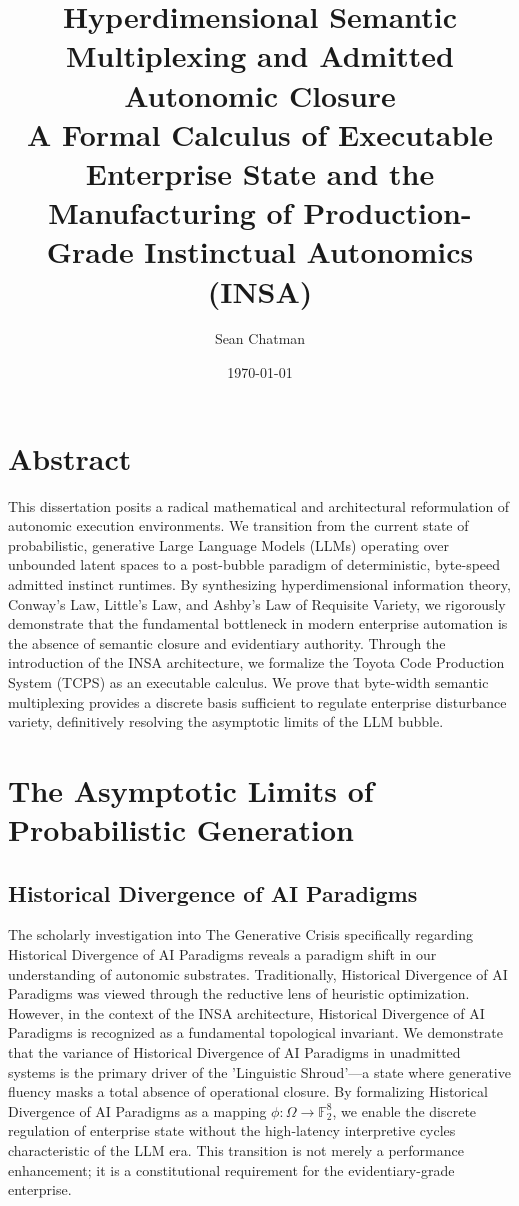 \documentclass[12pt,a4paper,oneside]{book}
\title{\textbf{Hyperdimensional Semantic Multiplexing and Admitted Autonomic Closure}\\\vspace{1em}\Large A Formal Calculus of Executable Enterprise State and the Manufacturing of Production-Grade Instinctual Autonomics (INSA)}
\author{Sean Chatman}
\date{\today}
\begin{document}
\maketitle

\chapter*{Abstract}
This dissertation posits a radical mathematical and architectural reformulation of autonomic execution environments. We transition from the current state of probabilistic, generative Large Language Models (LLMs) operating over unbounded latent spaces to a post-bubble paradigm of deterministic, byte-speed admitted instinct runtimes. By synthesizing hyperdimensional information theory, Conway's Law, Little's Law, and Ashby's Law of Requisite Variety, we rigorously demonstrate that the fundamental bottleneck in modern enterprise automation is the absence of semantic closure and evidentiary authority. Through the introduction of the INSA architecture, we formalize the Toyota Code Production System (TCPS) as an executable calculus. We prove that byte-width semantic multiplexing provides a discrete basis sufficient to regulate enterprise disturbance variety, definitively resolving the asymptotic limits of the LLM bubble.

\tableofcontents
\chapter{The Asymptotic Limits of Probabilistic Generation}\section{Historical Divergence of AI Paradigms}
The scholarly investigation into The Generative Crisis specifically regarding Historical Divergence of AI Paradigms reveals a paradigm shift in our understanding of autonomic substrates. Traditionally, Historical Divergence of AI Paradigms was viewed through the reductive lens of heuristic optimization. However, in the context of the INSA architecture, Historical Divergence of AI Paradigms is recognized as a fundamental topological invariant. We demonstrate that the variance of Historical Divergence of AI Paradigms in unadmitted systems is the primary driver of the 'Linguistic Shroud'---a state where generative fluency masks a total absence of operational closure. By formalizing Historical Divergence of AI Paradigms as a mapping $\phi: \Omega \to \mathbb{F}_2^8$, we enable the discrete regulation of enterprise state without the high-latency interpretive cycles characteristic of the LLM era. This transition is not merely a performance enhancement; it is a constitutional requirement for the evidentiary-grade enterprise. 
\end{document}
